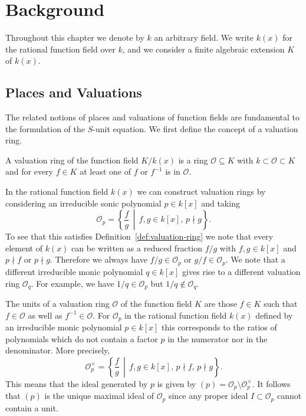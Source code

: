 
\chapter{Background}%
\label{chap:background}

Throughout this chapter we denote by \(k\) an arbitrary field. We write \(k(x)\) for the rational function field over \(k\), and we consider a finite algebraic extension \(K\) of \(k(x)\).

\section{Places and Valuations}%
\label{sec:places-and-valuations}

The related notions of places and valuations of function fields are fundamental to the formulation of the \(S\)-unit equation. We first define the concept of a valuation ring.

\begin{definition}%
  \label{def:valuation-ring}
  A valuation ring of the function field \(K / k(x)\) is a ring \(\mathcal{O} \subseteq K\) with \(k \subset \mathcal{O} \subset K\) and for every \(f \in K\) at least one of \(f\) or \(f^{-1}\) is in \(\mathcal{O}\).
\end{definition}

In the rational function field \(k(x)\) we can construct valuation rings by considering an irreducible sonic polynomial \(p \in k[x]\) and taking
\[\mathcal{O}_{p} = \left\{ \frac{f}{g} \,\middle|\, f,g \in k[x] ,\, p \nmid g \right\}.\]
To see that this satisfies Definition~\ref{def:valuation-ring} we note that every element of \(k(x)\) can be written as a reduced fraction \(f/g\) with \(f,g \in k[x]\) and \(p \nmid f\) or \(p \nmid g\). Therefore we always have \(f/g \in \mathcal{O}_{p}\) or \(g/f \in \mathcal{O}_{p}\). We note that a different irreducible monic polynomial \(q \in k[x]\) gives rise to a different valuation ring \(\mathcal{O}_{q}\). For example, we have \(1/q \in \mathcal{O}_{p}\) but \(1/q \notin \mathcal{O}_{q}\).

The units of a valuation ring \(\mathcal{O}\) of the function field \(K\) are those \(f \in K\) such that \(f \in \mathcal{O}\) as well as \(f^{-1} \in \mathcal{O}\). For \(\mathcal{O}_{p}\) in the rational function field \(k(x)\) defined by an irreducible monic polynomial \(p \in k[x]\) this corresponds to the ratios of polynomials which do not contain a factor \(p\) in the numerator nor in the denominator. More precisely,
\[\mathcal{O}_{p}^{\times} = \left\{ \frac{f}{g} \,\middle|\, f,g \in k[x] ,\, p \nmid f ,\, p \nmid g \right\}.\]
This means that the ideal generated by \(p\) is given by \((p) = \mathcal{O}_{p} \setminus \mathcal{O}_{p}^{\times}\). It follows that \((p)\) is the unique maximal ideal of \(\mathcal{O}_{p}\) since any proper ideal \(I \subset \mathcal{O}_{p}\) cannot contain a unit.

